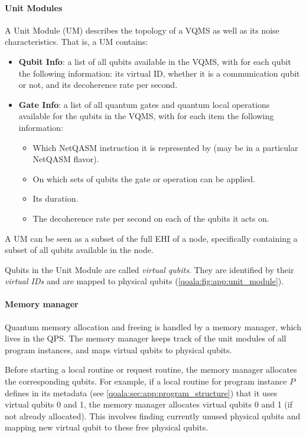 \paragraph{Unit Modules}
A Unit Module (UM) describes the topology of a VQMS as well as its noise characteristics.
That is, a UM contains:
\begin{itemize}
\item \textbf{Qubit Info}: a list of all qubits available in the VQMS, with for each qubit the following information:
its virtual ID,
whether it is a communication qubit or not, and
its decoherence rate per second.

\item \textbf{Gate Info}: a list of all quantum gates and quantum local operations available for the qubits in the VQMS, with for each item the following information:
\begin{itemize}
  \item Which NetQASM instruction it is represented by (may be in a particular NetQASM flavor).
  \item On which sets of qubits the gate or operation can be applied.
  \item Its duration.
  \item The decoherence rate per second on each of the qubits it acts on.
\end{itemize}
\end{itemize}

A UM can be seen as a subset of the full EHI of a node, specifically containing a subset of all qubits available in the node.

Qubits in the Unit Module are called \textit{virtual qubits}. They are identified by their \textit{virtual IDs} and are mapped to physical qubits (\cref{qoala:fig:app:unit_module}).



\paragraph{Memory manager}
Quantum memory allocation and freeing is handled by a memory manager, which lives in the QPS.
The memory manager keeps track of the unit modules of all program instances, and maps virtual qubits to physical qubits. 

Before starting a local routine or request routine, the memory manager allocates the corresponding qubits.
For example, if a local routine for program instance $P$ defines in its metadata (see \cref{qoala:sec:app:program_structure}) that it uses virtual qubits 0 and 1, the memory manager allocates virtual qubits 0 and 1 (if not already allocated).
This involves finding currently unused physical qubits and mapping new virtual qubit to these free physical qubits.

